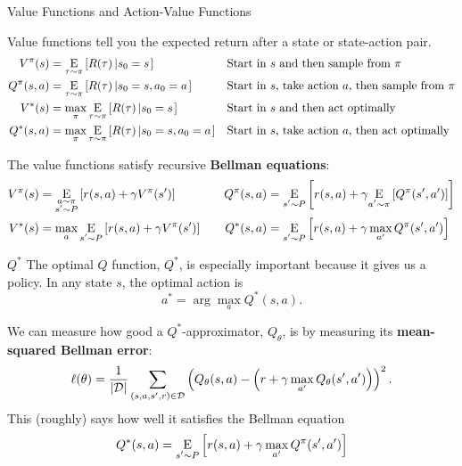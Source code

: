 \documentclass[9pt]{beamer}
\newcommand{\underE}[2]{\underset{\begin{subarray}{c}#1 \end{subarray}}{\E}\left[ #2 \right]}
\begin{document}
\begin{frame}{Value Functions and Action-Value Functions}

Value functions tell you the expected return after a state or state-action pair.
%
\begin{align*}
V^{\pi}(s) &= \underE{\tau \sim \pi}{R(\tau)\left| s_0 = s\right.} && \text{Start in }s\text{ and then sample from }\pi \\
Q^{\pi}(s,a) &= \underE{\tau \sim \pi}{R(\tau)\left| s_0 = s, a_0 = a\right.} && \text{Start in }s\text{, take action }a\text{, then sample from }\pi \\
V^*(s) &= \max_{\pi} \underE{\tau \sim \pi}{R(\tau)\left| s_0 = s\right.} && \text{Start in }s\text{ and then act optimally} \\
Q^*(s,a) &= \max_{\pi} \underE{\tau \sim \pi}{R(\tau)\left| s_0 = s, a_0 = a\right.} &&\text{Start in }s\text{, take action }a\text{, then act optimally}
\end{align*}

The value functions satisfy recursive \textbf{Bellman equations}:
%
\begin{align*}
V^{\pi}(s) &= \underE{a \sim \pi \\ s'\sim P}{r(s,a) + \gamma V^{\pi}(s')} &&&
Q^{\pi}(s,a) &= \underE{s'\sim P}{r(s,a) + \gamma \underE{a'\sim \pi}{Q^{\pi}(s',a')}} \\
V^*(s) &= \max_a \underE{s'\sim P}{r(s,a) + \gamma V^{\pi}(s')} &&&
Q^*(s,a) &= \underE{s'\sim P}{r(s,a) + \gamma \max_{a'} Q^{\pi}(s',a')}
\end{align*}

\end{frame}


\begin{frame}{$Q^*$}
The optimal $Q$ function, $Q^*$, is especially important because it gives us a policy. In any state $s$, the optimal action is
%
\begin{equation*}
a^* = \arg \max_a Q^* (s, a).
\end{equation*}

We can measure how good a $Q^*$-approximator, $Q_{\theta}$, is by measuring its \textbf{mean-squared Bellman error}:
%
\begin{equation*}
\ell(\theta) = \frac{1}{|{\mathcal D}|} \sum_{(s,a,s',r) \in {\mathcal D}} \left( Q_{\theta}(s,a) - \left(r + \gamma \max_{a'} Q_{\theta}(s',a')\right)\right)^2.
\end{equation*}
%
This (roughly) says how well it satisfies the Bellman equation
%
\begin{equation*}
Q^*(s,a) = \underE{s'\sim P}{r(s,a) + \gamma \max_{a'} Q^{\pi}(s',a')}
\end{equation*}

\end{frame}
\end{document}
